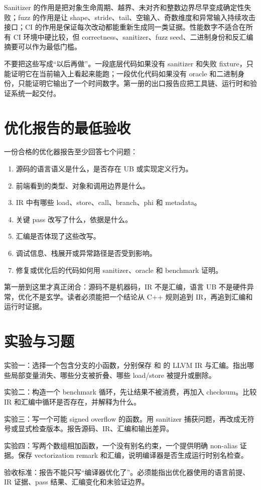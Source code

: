 Sanitizer 的作用是把对象生命周期、越界、未对齐和整数边界尽早变成确定性失败；fuzz 的作用是让 shape、stride、tail、空输入、奇数维度和异常输入持续攻击接口；CI 的作用是保证每次改动都能重新生成同一类证据。性能数字不适合在所有 CI 环境中硬比较，但 correctness、sanitizer、fuzz seed、二进制身份和反汇编摘要可以作为最低门槛。

不要把这些写成“以后再做”。一段底层代码如果没有 sanitizer 和失败 fixture，只能证明它在当前输入上看起来能跑；一段优化代码如果没有 oracle 和二进制身份，只能证明它输出了一个时间数字。第一册的出口报告应把工具链、运行时和验证系统一起交付。

\section{优化报告的最低验收}

一份合格的优化器报告至少回答七个问题：

\begin{enumerate}
  \item 源码的语言语义是什么，是否存在 UB 或实现定义行为。
  \item 前端看到的类型、对象和调用边界是什么。
  \item IR 中有哪些 load、store、call、branch、phi 和 metadata。
  \item 关键 pass 改写了什么，依据是什么。
  \item 汇编是否体现了这些改写。
  \item 调试信息、栈展开或异常路径是否受到影响。
  \item 修复或优化后的代码如何用 sanitizer、oracle 和 benchmark 证明。
\end{enumerate}

\begin{keyidea}
第一册到这里才真正闭合：源码不是机器码，IR 不是汇编，语言 UB 不是硬件异常，优化不是玄学。读者必须能把一个结论从 C++ 规则追到 IR，再追到汇编和运行时证据。
\end{keyidea}

\section{实验与习题}

实验一：选择一个包含分支的小函数，分别保存  和  的 LLVM IR 与汇编。指出哪些局部变量消失、哪些分支被折叠、哪些 load/store 被提升或删除。

实验二：构造一个 benchmark 循环，先让结果不被消费，再加入 checksum。比较 IR 和汇编中循环是否存在，并解释为什么。

实验三：写一个可能 signed overflow 的函数。用 sanitizer 捕获问题，再改成无符号或显式检查版本。报告源码、IR、汇编和输出差异。

实验四：写两个数组相加函数，一个没有别名约束，一个提供明确 non-alias 证据。保存 vectorization remark 和汇编，说明编译器是否生成运行时别名检查。

验收标准：报告不能只写“编译器优化了”。必须能指出优化器使用的语言前提、IR 证据、pass 结果、汇编变化和未验证边界。
